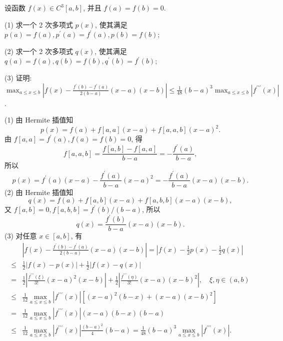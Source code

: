     \begin{tcolorbox}[enhanced,colback=10,colframe=9,breakable,coltitle=green!25!black,title=2024]
 设函数 $ f(x) \in C^{3}[a, b] $, 并且 $ f(a)=f(b)=0 $.
 
(1) 求一个 2 次多项式 $ p(x) $, 使其满足 $ p(a)=f(a), p^{\prime}(a)=f^{\prime}(a), p(b)=f(b) $;

(2) 求一个 2 次多项式 $ q(x) $, 使其满足 $ q(a)=f(a), q(b)=f(b), q^{\prime}(b)=f^{\prime}(b) $;

(3) 证明: $\displaystyle \max _{a \leqslant x \leqslant b}\left|f(x)-\frac{f^{\prime}(b)-f^{\prime}(a)}{2(b-a)}(x-a)(x-b)\right| \leqslant \frac{1}{48}(b-a)^{3} \max _{a \leqslant x \leqslant b}\left|f^{\prime \prime \prime}(x)\right| $.

 \tcblower
 (1) 由 Hermite 插值知
$$
p(x)=f(a)+f[a, a](x-a)+f[a, a, b](x-a)^{2} .
$$
由 $ f[a, a]=f^{\prime}(a), f(a)=f(b)=0 $, 得
$$
f[a, a, b]=\frac{f[a, b]-f[a, a]}{b-a}=-\frac{f^{\prime}(a)}{b-a},
$$
所以
$$
p(x)=f^{\prime}(a)(x-a)-\frac{f^{\prime}(a)}{b-a}(x-a)^{2}=-\frac{f^{\prime}(a)}{b-a}(x-a)(x-b) .
$$
(2) 由 Hermite 插值知
$$
q(x)=f(a)+f[a, b](x-a)+f[a, b, b](x-a)(x-b),
$$
又 $ f[a, b]=0, f[a, b, b]=f^{\prime}(b) /(b-a) $, 所以
$$
q(x)=\frac{f^{\prime}(b)}{b-a}(x-a)(x-b) .
$$
(3) 对任意 $ x \in[a, b] $, 有
$$
\begin{aligned}
 &\left|f(x)-\frac{f^{\prime}(b)-f^{\prime}(a)}{2(b-a)}(x-a)(x-b)\right| 
=  \left|f(x)-\frac{1}{2} p(x)-\frac{1}{2} q(x)\right| \\
\leqslant & \frac{1}{2}|f(x)-p(x)|+\frac{1}{2}|f(x)-q(x)| \\
= & \frac{1}{2}\left|\frac{f^{\prime \prime \prime}(\xi)}{3!}(x-a)^{2}(x-b)\right|+\frac{1}{2}\left|\frac{f^{\prime \prime \prime}(\eta)}{3!}(x-a)(x-b)^{2}\right|, \quad \xi, \eta \in(a, b) \\
\leqslant & \frac{1}{12} \max _{a \leqslant x \leqslant b}\left|f^{\prime \prime \prime}(x)\right|\left[(x-a)^{2}(b-x)+(x-a)(x-b)^{2}\right] \\
= & \frac{1}{12} \max _{a \leqslant x \leqslant b}\left|f^{\prime \prime \prime}(x)\right|(x-a)(b-x)(b-a) \\
\leqslant & \frac{1}{12} \max _{a \leqslant x \leqslant b}\left|f^{\prime \prime \prime}(x)\right| \frac{(b-a)^{2}}{4}(b-a) =  \frac{1}{48}(b-a)^{3} \max _{a \leqslant x \leqslant b}\left|f^{\prime \prime \prime}(x)\right| .
\end{aligned}
$$
 \end{tcolorbox}


